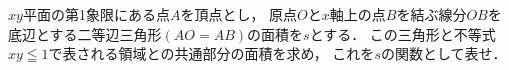 \documentclass[../../main.tex]{subfiles}
\begin{document}
$xy$平面の第1象限にある点$A$を頂点とし，
原点$O$と$x$軸上の点$B$を結ぶ線分$OB$を底辺とする二等辺三角形$(AO=AB)$の面積を$s$とする．
この三角形と不等式$xy\leqq1$で表される領域との共通部分の面積を求め，
これを$s$の関数として表せ．
\end{document}

